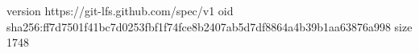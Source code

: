 version https://git-lfs.github.com/spec/v1
oid sha256:ff7d7501f41bc7d0253fbf1f74fce8b2407ab5d7df8864a4b39b1aa63876a998
size 1748
